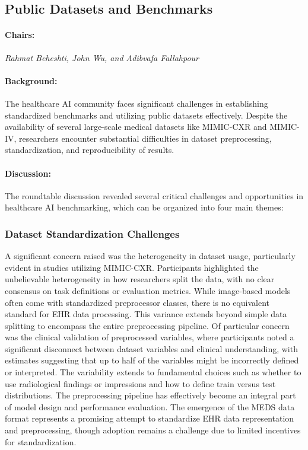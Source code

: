 \subsection{Public Datasets and Benchmarks}
\paragraph{Chairs:} \textit{Rahmat Beheshti, John Wu, and Adibvafa Fallahpour}
\paragraph{Background:}

The healthcare AI community faces significant challenges in establishing standardized benchmarks and utilizing public datasets effectively. Despite the availability of several large-scale medical datasets like MIMIC-CXR and MIMIC-IV, researchers encounter substantial difficulties in dataset preprocessing, standardization, and reproducibility of results.
\paragraph{Discussion:}
The roundtable discussion revealed several critical challenges and opportunities in healthcare AI benchmarking, which can be organized into four main themes:

\subsubsection{Dataset Standardization Challenges}
A significant concern raised was the heterogeneity in dataset usage, particularly evident in studies utilizing MIMIC-CXR. Participants highlighted the unbelievable heterogeneity in how researchers split the data, with no clear consensus on task definitions or evaluation metrics. While image-based models often come with standardized preprocessor classes, there is no equivalent standard for EHR data processing. This variance extends beyond simple data splitting to encompass the entire preprocessing pipeline. Of particular concern was the clinical validation of preprocessed variables, where participants noted a significant disconnect between dataset variables and clinical understanding, with estimates suggesting that up to half of the variables might be incorrectly defined or interpreted. The variability extends to fundamental choices such as whether to use radiological findings or impressions and how to define train versus test distributions. The preprocessing pipeline has effectively become an integral part of model design and performance evaluation. The emergence of the MEDS data format represents a promising attempt to standardize EHR data representation and preprocessing, though adoption remains a challenge due to limited incentives for standardization.


